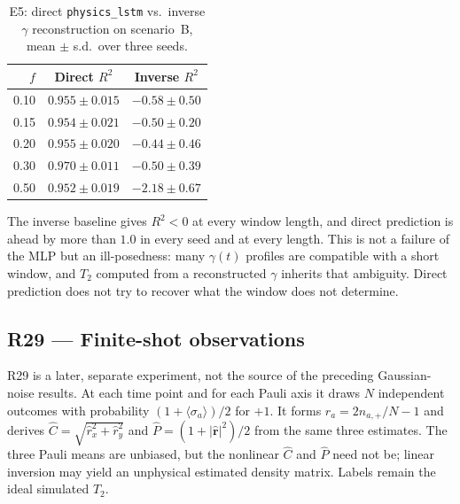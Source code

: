 \documentclass[twocolumn,10pt]{article}
\begin{document}
\begin{table}[h]
\centering
\caption{E5: direct \texttt{physics\_lstm} vs.\ inverse $\gamma$
  reconstruction on scenario~B, mean $\pm$ s.d.\ over three
  seeds.\label{tab:e5}}
\small
\begin{tabular}{rcc}
\toprule
$f$ & Direct $R^2$ & Inverse $R^2$ \\
\midrule
0.10 & $\mathbf{0.955 \pm 0.015}$ & $-0.58 \pm 0.50$ \\
0.15 & $\mathbf{0.954 \pm 0.021}$ & $-0.50 \pm 0.20$ \\
0.20 & $\mathbf{0.955 \pm 0.020}$ & $-0.44 \pm 0.46$ \\
0.30 & $\mathbf{0.970 \pm 0.011}$ & $-0.50 \pm 0.39$ \\
0.50 & $\mathbf{0.952 \pm 0.019}$ & $-2.18 \pm 0.67$ \\
\bottomrule
\end{tabular}
\end{table}

The inverse baseline gives $R^2 < 0$ at every window length, and
direct prediction is ahead by more than $1.0$ in every seed and at every
length. This is not a
failure of the MLP but an ill-posedness: many $\gamma(t)$ profiles are
compatible with a short window, and $T_2$ computed from a reconstructed
$\gamma$ inherits that ambiguity. Direct prediction does not try to
recover what the window does not determine.

\subsection{R29 --- Finite-shot observations}
\label{sec:r29}
R29 is a later, separate experiment, not the source of the preceding
Gaussian-noise results. At each time point and for each Pauli axis it draws
$N$ independent outcomes with probability $(1+\langle\sigma_a\rangle)/2$
for $+1$. It forms $\hat r_a=2n_{a,+}/N-1$ and derives
$\hat C=\sqrt{\hat r_x^2+\hat r_y^2}$ and
$\hat P=(1+|\hat{\mathbf r}|^2)/2$ from the same three estimates. The
three Pauli means are unbiased, but the nonlinear $\hat C$ and $\hat P$
need not be; linear inversion may yield an unphysical estimated density
matrix. Labels remain the ideal simulated $T_2$.
\end{document}
